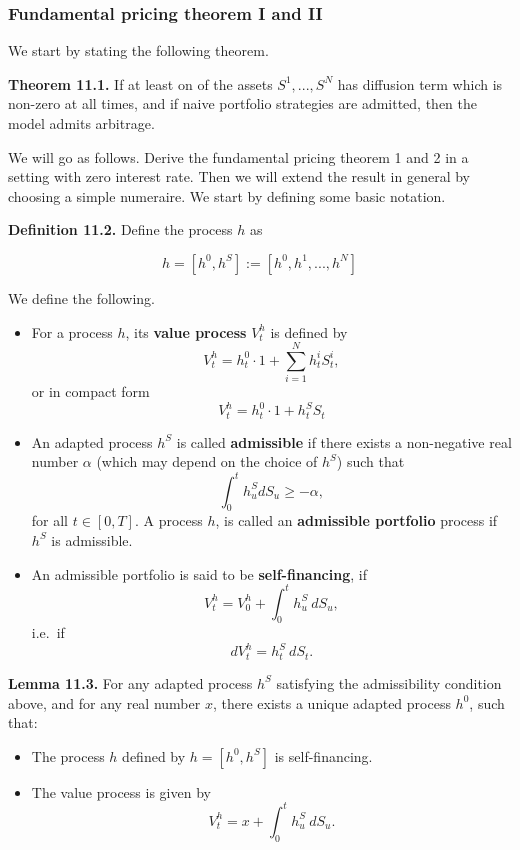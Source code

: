 \documentclass[
]{article}
\providecommand{\tightlist}{%
  \setlength{\itemsep}{0pt}\setlength{\parskip}{0pt}}
\begin{document}
\hypertarget{fundamental-pricing-theorem-i-and-ii}{%
\subsubsection{Fundamental pricing theorem I and
II}\label{fundamental-pricing-theorem-i-and-ii}}

We start by stating the following theorem.

\textbf{Theorem 11.1.} If at least on of the assets \(S^1,...,S^N\) has
diffusion term which is non-zero at all times, and if naive portfolio
strategies are admitted, then the model admits arbitrage.

We will go as follows. Derive the fundamental pricing theorem 1 and 2 in
a setting with zero interest rate. Then we will extend the result in
general by choosing a simple numeraire. We start by defining some basic
notation.

\textbf{Definition 11.2.} Define the process \(h\) as

\[
h=[h^0,h^S]:=[h^0,h^1,...,h^N]
\]

We define the following.

\begin{itemize}
\tightlist
\item
  For a process \(h\), its \textbf{value process} \(V_t^h\) is defined
  by \[
    V_t^h=h^0_t\cdot 1+\sum_{i=1}^Nh_t^iS_t^i,
    \] or in compact form \[
    V_t^h=h_t^0\cdot 1 + h_t^S S_t
    \]
\item
  An adapted process \(h^S\) is called \textbf{admissible} if there
  exists a non-negative real number \(\alpha\) (which may depend on the
  choice of \(h^S\)) such that \[
    \int_0^th_u^SdS_u\ge -\alpha,
    \] for all \(t\in[0,T]\). A process \(h\), is called an
  \textbf{admissible portfolio} process if \(h^S\) is admissible.
\item
  An admissible portfolio is said to be \textbf{self-financing}, if \[
    V_t^h=V_0^h+\int_0^th_u^S\ dS_u,
    \] i.e.~if \[
    dV_t^h=h_t^S\ dS_t.
    \]
\end{itemize}

\textbf{Lemma 11.3.} For any adapted process \(h^S\) satisfying the
admissibility condition above, and for any real number \(x\), there
exists a unique adapted process \(h^0\), such that:

\begin{itemize}
\tightlist
\item
  The process \(h\) defined by \(h=[h^0,h^S]\) is self-financing.
\item
  The value process is given by \[
    V_t^h=x+\int_0^th_u^S\ dS_u.
    \]
\end{itemize}
\end{document}
